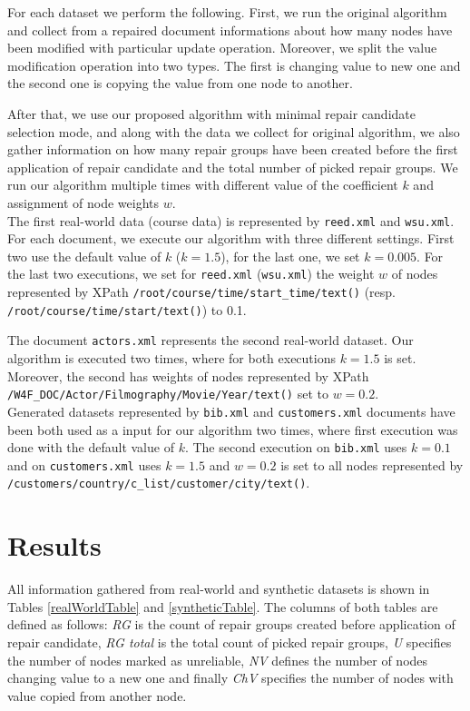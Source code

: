 For each dataset we perform the following. First, we run the original algorithm and collect from a repaired document informations about how many nodes have been modified with particular update operation. Moreover, we split the value modification operation into two types. The first is changing value to new one and the second one is copying the value from one node to another.

After that, we use our proposed algorithm with minimal repair candidate selection mode, and along with the data we collect for original algorithm, we also gather information on how many repair groups have been created before the first application of repair candidate and the total number of picked repair groups. We run our algorithm multiple times with different value of the coefficient $k$ and assignment of node weights $w$.\\

The first real-world data (course data) is represented by \texttt{reed.xml} and \texttt{wsu.xml}. For each document, we execute our algorithm with three different settings. First two use the default value of $k$ ($k=1.5$), for the last one, we set $k=0.005$. For the last two executions, we set for \texttt{reed.xml} (\texttt{wsu.xml}) the weight $w$ of nodes represented by XPath \texttt{/root/course/time/start\_time/text()} (resp. \texttt{/root/\discretionary{}{}{}course/time/\discretionary{}{}{}start/text()}) to 0.1.

The document \texttt{actors.xml} represents the second real-world dataset. Our algorithm is executed two times, where for both executions $k=1.5$ is set. Moreover, the second has weights of nodes represented by XPath \texttt{/W4F\_DOC/\discretionary{}{}{}Actor/Filmography/Movie/Year/text()} set to $w=0.2$.\\

Generated datasets represented by \texttt{bib.xml} and \texttt{customers.xml} documents have been both used as a input for our algorithm two times, where first execution was done with the default value of $k$. The second execution on \texttt{bib.xml} uses $k=0.1$ and on \texttt{customers.xml} uses $k=1.5$ and $w=0.2$ is set to all nodes represented by \texttt{/customers/country/c\_list/customer/city/text()}.

\section{Results}

All information gathered from real-world and synthetic datasets is shown in Tables \ref{realWorldTable} and \ref{syntheticTable}. The columns of both tables are defined as follows: \emph{RG} is the count of repair groups created before application of repair candidate, \emph{RG total} is the total count of picked repair groups, \emph{U} specifies the number of nodes marked as unreliable, \emph{NV} defines the number of nodes changing value to a new one and finally \emph{ChV} specifies the number of nodes with value copied from another node.\\


